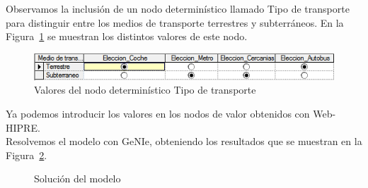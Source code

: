 \documentclass[12pt,a4paper,twoside,openright,titlepage,final]{article}
\begin{document}
Observamos la inclusión de un nodo determinístico llamado Tipo de transporte para distinguir entre los medios de transporte terrestres y subterráneos. En la Figura~\ref{fig:tipo_de_transporte} se muestran los distintos valores de este nodo.\\ 

\begin{figure}[htbp!]
\centering
\includegraphics[width=0.6\linewidth]{imagenes/tipo_de_transporte}
\caption{Valores del nodo determinístico Tipo de transporte} \label{fig:tipo_de_transporte}
\end{figure}

Ya podemos introducir los valores en los nodos de valor obtenidos con Web-HIPRE.\\

Resolvemos el modelo con GeNIe, obteniendo los resultados que se muestran en la Figura~\ref{fig:solucion}.

\begin{figure}[htbp!]
\centering
{}
\caption{Solución del modelo} \label{fig:solucion}
\end{figure}
\end{document}
